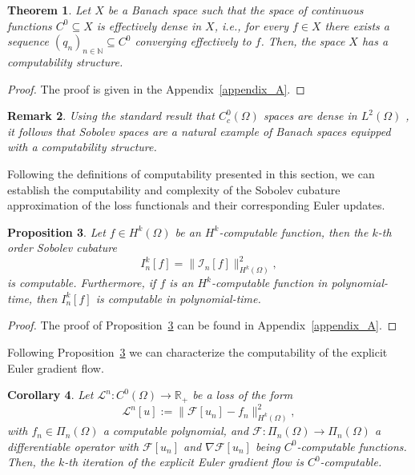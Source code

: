 \documentclass[pdflatex]{sn-jnl}%
\newtheorem{theorem}{Theorem}[section]%
\newtheorem{corollary}[theorem]{Corollary}
\newtheorem{remark}[theorem]{Remark}
\newtheorem{proposition}[theorem]{Proposition}%
\begin{document}
\begin{theorem}\label{thm:compt_structures}
    Let $X$ be a Banach space such that the space of continuous functions $C^0\subseteq X$ is effectively dense in $X$, i.e., for every $f\in X$ there exists a sequence $(q_n)_{n\in\mathbb{N}}\subseteq C^0$ converging effectively to $f$. Then, the space $X$ has a computability structure.
\end{theorem}
\vspace{-1em}\begin{proof}
    The proof is given in the Appendix~\ref{appendix_A}.
\end{proof}
\begin{remark}
Using the standard result that $C^0_c(\Omega)$ spaces are dense in $L^2(\Omega)$ \cite{Rudin1986-qe}, it follows that Sobolev spaces are a natural example of Banach spaces equipped with a computability structure. 
\end{remark}
Following the definitions of computability presented in this section, we can establish the computability and complexity of the Sobolev cubature approximation of the loss functionals and their corresponding Euler updates.
\begin{proposition}\label{prop:comp_cub}
Let $f\in H^k(\Omega)$ be an $H^k$-computable function, then the $k$-th order Sobolev cubature
$$
I^k_n[f]=\|\mathcal{I}_n[f]\|_{H^k(\Omega)}^2,
$$
is computable. Furthermore, if $f$ is an $H^k$-computable function in polynomial-time, then $I^k_n[f]$ is computable in polynomial-time.
\end{proposition}
\vspace{-1em}\begin{proof}
    The proof of Proposition~\ref{prop:comp_cub} can be found in Appendix~\ref{appendix_A}.
\end{proof}
Following Proposition~\ref{prop:comp_cub} we can characterize the computability of the explicit Euler gradient flow. 
\begin{corollary}\label{cor:comp_GF}
    Let $\mathcal{L}^n:C^0(\Omega)\rightarrow \mathbb{R}_+$ be a loss of the form
    \begin{equation}
        \mathcal{L}^n[u]:=\|\mathcal{F}[u_n]-f_n\|_{H^k(\Omega)}^2,
    \end{equation}
    with $f_n\in \Pi_{n}(\Omega)$ a computable polynomial, and $\mathcal{F}:\Pi_{n}(\Omega)\rightarrow \Pi_{n}(\Omega)$ a differentiable operator with $\mathcal{F}[u_n]$ and $\nabla\mathcal{F}[u_n]$ being $C^0$-computable functions. Then, the $k$-th iteration of the explicit Euler gradient flow is $C^0$-computable.  
\end{corollary}
\end{document}
